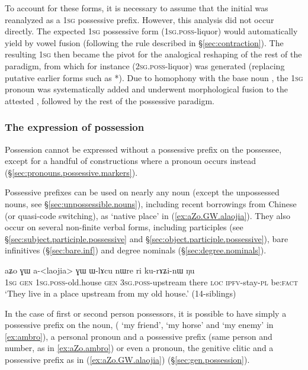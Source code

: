 To account for these forms, it is necessary to assume that the initial  was reanalyzed as a \textsc{1sg} possessive prefix. However, this analysis did not occur directly. The expected \textsc{1sg} possessive form  (\textsc{1sg}.\textsc{poss}-liquor) would automatically yield  by vowel fusion (following the rule described in §\ref{sec:contraction}). The resulting \textsc{1sg}  then became the pivot for the analogical reshaping of the rest of the paradigm, from which for instance   (\textsc{2sg}.\textsc{poss}-liquor) was generated (replacing putative earlier forms such as  *). Due to homophony with the base noun , the \textsc{1sg} pronoun  was systematically added and  underwent morphological fusion to the attested , followed by the rest of the possessive paradigm.
 

\subsubsection{The expression of possession} \label{ex:prefix.expression.of.possession}
Possession cannot be expressed without a possessive prefix on the possessee, except for a handful of constructions where a pronoun occurs instead (§\ref{sec:pronouns.possessive.markers}).

Possessive prefixes can be used on nearly any noun (except the unpossessed nouns, see §\ref{sec:unpossessible.nouns}), including recent borrowings from Chinese (or quasi-code switching), as   `native place' in (\ref{ex:aZo.GW.alaojia}). They also occur on several non-finite verbal forms, including participles (see §\ref{sec:subject.participle.possessive} and §\ref{sec:object.participle.possessive}), bare infinitives (§\ref{sec:bare.inf}) and degree nominals (§\ref{sec:degree.nominals}).
\largerpage
\begin{exe}
\ex \label{ex:aZo.GW.alaojia}
\gll aʑo ɣɯ a-<laojia> ɣɯ ɯ-lɤcu nɯre ri ku-rɤʑi-nɯ ŋu \\
\textsc{1sg} \textsc{gen} \textsc{1sg}.\textsc{poss}-old.house \textsc{gen} \textsc{3sg}.\textsc{poss}-upstream there \textsc{loc} \textsc{ipfv}-stay-\textsc{pl} be:\textsc{fact} \\
\glt `They live in a place upstream from my old house.' (14-siblings) 
\end{exe}

In the case of first or second person possessors, it is possible to have simply a possessive prefix on the noun, ( `my friend',  `my horse' and  `my enemy' in \ref{ex:ambro}), a personal pronoun and a possessive prefix (same person and number, as in \ref{ex:aZo.ambro}) or even a pronoun, the genitive clitic  and a possessive prefix as in (\ref{ex:aZo.GW.alaojia}) (§\ref{sec:gen.possession}).

